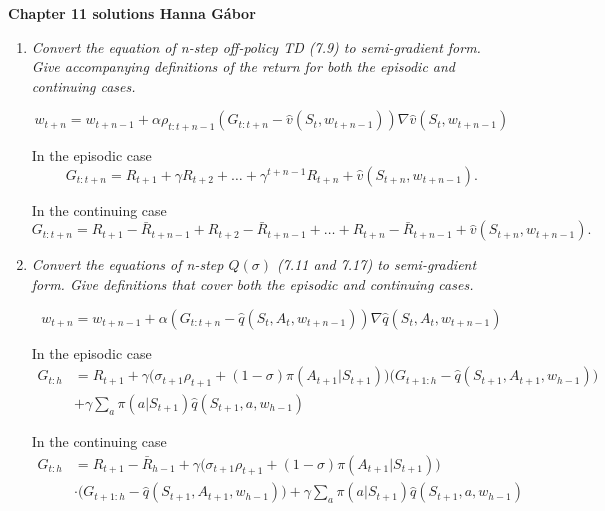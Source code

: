 \documentclass[12pt,a4paper]{article}
\begin{document}
\textbf{Chapter 11 solutions  \hfill Hanna Gábor}

\begin{enumerate}
  \item \textit{Convert the equation of n-step off-policy TD (7.9) to semi-gradient
  form. Give accompanying definitions of the return for both the episodic and
  continuing cases.}

  \[w_{t + n} = w_{t + n - 1} + \alpha \rho_{t : t + n - 1}(G_{t: t + n} - \hat{v}(S_t,
  w_{t + n - 1})) \nabla \hat{v}(S_t, w_{t + n - 1})\]

  In the episodic case
  \[G_{t : t + n} = R_{t + 1} + \gamma R_{t + 2} + \dots + \gamma^{t + n - 1} R_{t + n} +
  \hat{v}(S_{t + n}, w_{t + n - 1}).\]

  In the continuing case
  \[G_{t : t + n} = R_{t + 1} - \bar{R}_{t + n - 1} + R_{t + 2} - \bar{R}_{t + n - 1}
  + \dots + R_{t + n} - \bar{R}_{t + n - 1} + \hat{v}(S_{t + n}, w_{t + n - 1}).\]

  \item \textit{Convert the equations of n-step $Q(\sigma)$ (7.11
  and 7.17) to semi-gradient form. Give definitions that cover both the
  episodic and continuing cases.}

  \[w_{t + n} = w_{t + n - 1} + \alpha (G_{t: t+ n}
  - \hat{q}(S_t, A_t, w_{t + n - 1})) \nabla\hat{q}(S_t, A_t, w_{t + n - 1})\]

  In the episodic case
  \begin{align*}
    G_{t: h} &= R_{t + 1} + \gamma\Big(\sigma_{t + 1}\rho_{t + 1}
    + (1 - \sigma) \pi(A_{t + 1}|S_{t + 1})\Big)
    \Big(G_{t + 1: h} - \hat{q}(S_{t + 1}, A_{t + 1}, w_{h - 1})\Big)\\
    &+ \gamma \sum\limits_a \pi(a|S_{t + 1}) \hat{q}(S_{t + 1}, a, w_{h - 1})
  \end{align*}

  In the continuing case
  \begin{align*}
    G_{t: h} &= R_{t + 1} - \bar{R}_{h - 1} + \gamma\Big(\sigma_{t + 1}\rho_{t + 1}
    + (1 - \sigma) \pi(A_{t + 1}|S_{t + 1})\Big)\\
    &\cdot \Big(G_{t + 1: h} - \hat{q}(S_{t + 1}, A_{t + 1}, w_{h - 1})\Big)
    + \gamma \sum\limits_a \pi(a|S_{t + 1}) \hat{q}(S_{t + 1}, a, w_{h - 1})
  \end{align*}

\end{enumerate}
\end{document}
